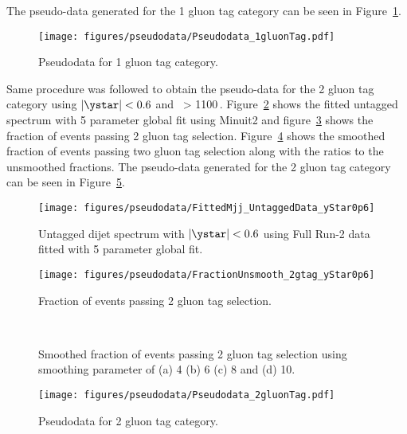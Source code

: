 The pseudo-data generated for the 1 gluon tag category can be seen in Figure~\ref{fig:pseudodata_1gtag}.

 \begin{figure}[!htb]
   \centering
   \texttt{[image: figures/pseudodata/Pseudodata\_1gluonTag.pdf]}
   \caption{Pseudodata for 1 gluon tag category.
   \label{fig:pseudodata_1gtag}}
 \end{figure}

Same procedure was followed to obtain the pseudo-data for the 2 gluon tag category using $|\ystar|<0.6$ and \mjj\ > 1100\,\GeV. 
Figure~\ref{fig:mjjFit_ystar0p6} shows the fitted untagged spectrum with 5 parameter global fit using Minuit2 and figure~\ref{fig:fraction_2gtag_unsmooth} shows the fraction of events passing 2 gluon tag selection.
Figure~\ref{fig:smoothFractions_2gtag} shows the smoothed fraction of events passing two gluon tag selection along with the ratios to the unsmoothed fractions. The pseudo-data 
generated for the 2 gluon tag category can be seen in Figure~\ref{fig:pseudodata_2gtag}.

 \begin{figure}[!htb]
   \centering
   \texttt{[image: figures/pseudodata/FittedMjj\_UntaggedData\_yStar0p6]}
   \caption{Untagged dijet spectrum with $|\ystar|<0.6$ using Full Run-2 data fitted with 5 parameter global fit.
   \label{fig:mjjFit_ystar0p6}}
 \end{figure}

 \begin{figure}[!htb]
   \centering
   \texttt{[image: figures/pseudodata/FractionUnsmooth\_2gtag\_yStar0p6]}
   \caption{Fraction of events passing 2 gluon tag selection.
   \label{fig:fraction_2gtag_unsmooth}}
 \end{figure}


\begin{figure}[htbp]
        \centering
        \\
        \caption{Smoothed fraction of events passing 2 gluon tag selection using smoothing parameter of
        (a) 4 (b) 6 (c) 8 and (d) 10.}
        \label{fig:smoothFractions_2gtag}
\end{figure}

 \begin{figure}[!htb]
   \centering
   \texttt{[image: figures/pseudodata/Pseudodata\_2gluonTag.pdf]}
   \caption{Pseudodata for 2 gluon tag category.
   \label{fig:pseudodata_2gtag}}
 \end{figure}




